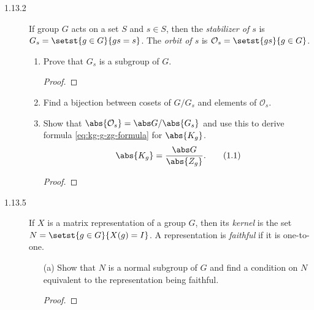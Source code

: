 \documentclass{math174}
\date{Wednesday, February 6}
\author{}
\begin{document}
\begin{description}
\item[1.13.2] If group \(G\) acts on a set \(S\) and \(s \in S\), then
  the \emph{stabilizer of \(s\)} is \(G_s = \setst{g \in G}{gs=s}\).
  The \emph{orbit of \(s\)} is \(\mathcal O_s =\setst{gs}{g \in G}\).
  \begin{enumerate}
  \item Prove that \(G_s\) is a subgroup of \(G\).

    \begin{solution}
      \begin{proof}

      \end{proof}
    \end{solution}

  \item Find a bijection between cosets of \(G/G_s\) and elements of
    \(\mathcal O_s\).

    \begin{solution}

    \end{solution}

  \item Show that \(\abs{\mathcal O_s} = \abs G / \abs{G_s}\) and use
    this to derive formula \eqref{eq:kg-g-zg-formula} for
    \(\abs{K_g}\).
    \[
      \abs{K_g} = \frac{\abs G}{\abs{Z_g}}.
      \tag{1.1} \label{eq:kg-g-zg-formula}
    \]

    \begin{solution}
      \begin{proof}

      \end{proof}
    \end{solution}
  \end{enumerate}

\item[1.13.5] If \(X\) is a matrix representation of a group \(G\),
  then its \emph{kernel} is the set \(N = \setst{g \in G}{X(g) = I}\).
  A representation is \emph{faithful} if it is one-to-one.
  \begin{enumerate}
  \item[(a)] Show that \(N\) is a normal subgroup of \(G\) and find a
    condition on \(N\) equivalent to the representation being
    faithful.

    \begin{solution}
      \begin{proof}

      \end{proof}
    \end{solution}


\end{enumerate}
\end{description}
\end{document}
